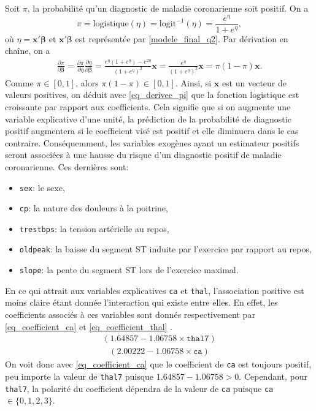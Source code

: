 \documentclass{article}
\begin{document}
	Soit $\pi$, la probabilité qu'un diagnostic de maladie coronarienne soit positif. On a
	$$\pi = \mathrm{logistique}(\eta) = \mathrm{logit}^{-1}(\eta) = \frac{e^{\eta}}{1+e^\eta},$$
	où $\eta = \boldsymbol{x'\beta}$ et $\boldsymbol{x'\beta}$ est représentée par \eqref{modele_final_q2}.
	Par dérivation en chaîne, on a 
	\begin{align}\label{eq_derivee_pi}
		\frac{\partial\pi}{\partial \boldsymbol{\beta}} 
		= \frac{\partial\pi}{\partial \eta}\frac{\partial\eta}{\partial \boldsymbol{\beta}}
		= \frac{e^\eta (1+e^\eta) - e^{2\eta}}{(1+e^\eta)^2} \boldsymbol{x}
		= \frac{e^\eta}{(1+e^\eta)^2}\boldsymbol{x} 
		= \pi(1-\pi)\boldsymbol{x}.
	\end{align}
	Comme $\pi\in[0,1]$, alors $\pi(1-\pi)\in[0,1]$. Ainsi, si $\boldsymbol{x}$ est un vecteur de valeurs positives, on déduit avec \eqref{eq_derivee_pi} que la fonction logistique est croissante par rapport aux coefficients.
	Cela signifie que si on augmente une variable explicative d'une unité, la prédiction de la probabilité de diagnostic positif augmentera si le coefficient visé est positif et elle diminuera dans le cas contraire.
	Conséquemment, les variables exogènes ayant un estimateur positifs seront associées à une hausse du risque d'un diagnostic positif de maladie coronarienne. Ces dernières sont: 
	\begin{itemize}
		\item \texttt{sex}: le sexe,
		\item \texttt{cp}: la nature des douleurs à la poitrine,
		\item \texttt{trestbps}: la tension artérielle au repos,
		\item \texttt{oldpeak}: la baisse du segment ST induite par l’exercice par rapport au repos,
		\item \texttt{slope}: la pente du segment ST lors de l’exercice maximal.
	\end{itemize}

	En ce qui attrait aux variables explicatives \texttt{ca} et \texttt{thal}, l'association positive est moins claire étant donnée l'interaction qui existe entre elles. En effet, les coefficients associés à ces variables sont donnés respectivement par \eqref{eq_coefficient_ca} et \eqref{eq_coefficient_thal} .
	\begin{align}\label{eq_coefficient_ca}
		\left( 1.64857 -1.06758  \times \texttt{thal7}\right)
	\end{align}
	\begin{align}\label{eq_coefficient_thal}
		\left(2.00222 -1.06758  \times \texttt{ca}\right)
	\end{align}
	On voit donc avec \eqref{eq_coefficient_ca} que le coefficient de \texttt{ca} est toujours positif, peu importe la valeur de  \texttt{thal7} puisque $1.64857 -1.06758 > 0$. Cependant, pour \texttt{thal7}, la polarité du coefficient dépendra de la valeur de \texttt{ca} puisque \texttt{ca} $\in \{0, 1, 2, 3\}$.
	
\end{document}
